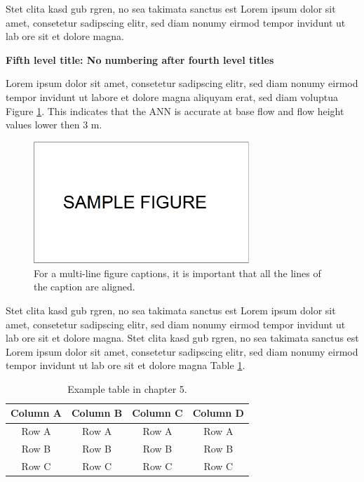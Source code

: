 Stet clita kasd gub rgren, no sea takimata sanctus est Lorem ipsum dolor sit amet, consetetur sadipscing elitr, sed diam nonumy eirmod tempor invidunt ut lab ore sit et dolore magna. 

\textbf{Fifth level title: No numbering after fourth level titles}

Lorem ipsum dolor sit amet, consetetur sadipscing elitr, sed diam nonumy eirmod tempor invidunt ut labore et dolore magna aliquyam erat, sed diam voluptua Figure \ref{fig:ch5-1}. This indicates that the ANN is accurate at base flow and flow height values lower then 3 m. 

\vspace{6pt} %
\begin{figure}[!ht]
    \centering
    \includegraphics[width=230pt,keepaspectratio=true]{./fig/sekil5}
    \caption{For a multi-line figure captions, it is important that all the
    lines of the caption are aligned.}
    \label{fig:ch5-1}
\end{figure}
\vspace{-6pt} %

Stet clita kasd gub rgren, no sea takimata sanctus est Lorem ipsum dolor sit amet, consetetur sadipscing elitr, sed diam nonumy eirmod tempor invidunt ut lab ore sit et dolore magna. Stet clita kasd gub rgren, no sea takimata sanctus est Lorem ipsum dolor sit amet, consetetur sadipscing elitr, sed diam nonumy eirmod tempor invidunt ut lab ore sit et dolore magna Table \ref{table:ch5-1}.

\vspace{6pt} %
\begin{table}[!ht]
\centering
\setlength{\tabcolsep}{14pt}
\caption{Example table in chapter 5.}
\begin{tabular}{cccc}
\toprule\midrule
Column A & Column B & Column C & Column D \\
\midrule
Row A & Row A & Row A & Row A \\
Row B & Row B & Row B & Row B \\
Row C & Row C & Row C & Row C \\
\bottomrule
\end{tabular}
\label{table:ch5-1}
\end{table}
\vspace{-6pt} %

